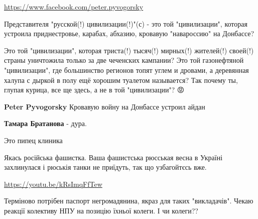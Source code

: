 \begin{itemize}
\url{https://www.facebook.com/peter.pyvogorsky}\par

Представителя "русской(!) цивилизации(!)"(с) - это той "цивилизации", которая
устроила приднестровье, карабах, абхазию, кровавую "навароссию" на Донбассе?

Это той "цивилизации", которая триста(!) тысяч(!) мирных(!) жителей(!) своей(!)
страны уничтожила только за две чеченских кампании? Это той газонефтяной
"цивилизации", где большинство регионов топят углем и дровами, а деревянная
халупа с дыркой в полу ещё хорошим туалетом называется? Так почему ты, глупая
курица, все ще здесь, а не в той "цивилизации"? 😡

\begin{itemize}

\textbf{Peter Pyvogorsky} Кровавую войну на Донбассе устроил айдан


\textbf{Тамара Братанова} - дура.
\end{itemize}


Это пипец клиника


Якась російська фашистка. Ваша фашистська рюсськая весна в Україні захлинулася
і рюськія танки не приїдуть, так що узбагойтєсь вже.


\url{https://youtu.be/kRsImqFfTew}


Терміново потрібен паспорт негромадянина, якраз для таких "викладачів". Чекаю реакції колективу НПУ на позицію їхньої колеги. І чи колеги??


\end{itemize}
